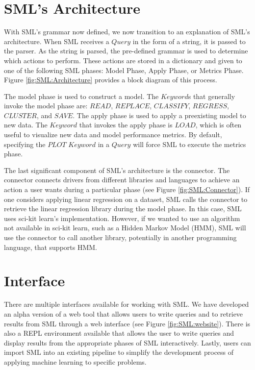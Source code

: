 \section{SML's Architecture}
\label{sml-architecture}

With SML's grammar now defined, we now transition to an explanation of SML's architecture.  When SML receives a \(Query\) in the form of a string, it is passed to the parser. As the string is parsed, the pre-defined grammar is used to determine which actions to perform.  These actions are stored in a dictionary and given to one of the following SML phases: Model Phase, Apply Phase, or Metrics Phase. Figure \ref{fig:SML:Architecture} provides a block diagram of this process.

The model phase is used to construct a model. The \(Keyword\)s that generally invoke the model phase are: \(READ\), \(REPLACE\), \(CLASSIFY\), \(REGRESS\), \(CLUSTER\), and \(SAVE\). The apply phase is used to apply a preexisting model to new data. The \(Keyword\) that invokes the apply phase is \(LOAD\), which is often useful to visualize new data and model performance metrics. By default, specifying the \(PLOT\) \(Keyword\) in a \(Query\) will force SML to execute the metrics phase.

The last significant component of SML's architecture is the connector. The connector connects drivers from different libraries and languages to achieve an action a user wants during a particular phase (see Figure \ref{fig:SML:Connector}). If one considers applying linear regression on a dataset, SML calls the connector to retrieve the linear regression library during the model phase. In this case, SML uses sci-kit learn's implementation. However, if we wanted to use an algorithm not available in sci-kit learn, such as a Hidden Markov Model (HMM), SML will use the connector to call another library, potentially in another programming language, that supports HMM.

\section{Interface}
\label{interface}

There are multiple interfaces available for working with SML. We have developed an alpha version of a web tool that allows users to write queries and to retrieve results from SML through a web interface (see Figure \ref{fig:SML:website}). There is also a REPL environment available that allows the user to write queries and display results from the appropriate phases of SML interactively.  Lastly,  users can import SML into an existing pipeline to simplify the development process of applying machine learning to specific problems.


